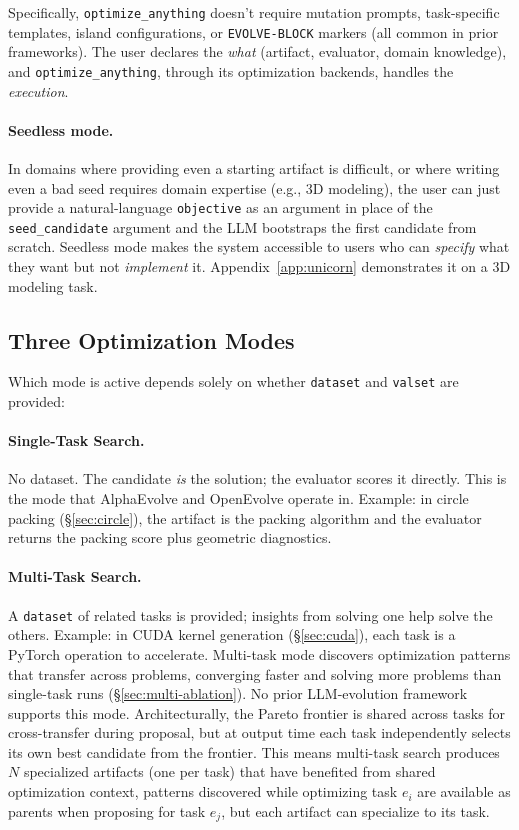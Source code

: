 \documentclass[sigconf]{acmart}
\newcommand{\oa}{\texttt{optimize\_anything}}
\begin{document}
Specifically, \oa{} doesn't require mutation prompts, task-specific templates, island configurations, or \texttt{EVOLVE-BLOCK} markers (all common in prior frameworks). The user declares the \emph{what} (artifact, evaluator, domain knowledge), and \oa{}, through its optimization backends, handles the \emph{execution}.

\paragraph{Seedless mode.} In domains where providing even a starting artifact is difficult, or where writing even a bad seed requires domain expertise (e.g., 3D modeling), the user can just provide a natural-language \texttt{objective} as an argument in place of the \texttt{seed\_candidate} argument and the LLM bootstraps the first candidate from scratch. Seedless mode makes the system accessible to users who can \emph{specify} what they want but not \emph{implement} it. Appendix~\ref{app:unicorn} demonstrates it on a 3D modeling task.

\subsection{Three Optimization Modes}\label{sec:modes}

Which mode is active depends solely on whether \texttt{dataset} and \texttt{valset} are provided:

\paragraph{Single-Task Search.} No dataset. The candidate \emph{is} the solution; the evaluator scores it directly. This is the mode that AlphaEvolve and OpenEvolve operate in. Example: in circle packing (\S\ref{sec:circle}), the artifact is the packing algorithm and the evaluator returns the packing score plus geometric diagnostics.

\paragraph{Multi-Task Search.} A \texttt{dataset} of related tasks is provided; insights from solving one help solve the others. Example: in CUDA kernel generation (\S\ref{sec:cuda}), each task is a PyTorch operation to accelerate. Multi-task mode discovers optimization patterns that transfer across problems, converging faster and solving more problems than single-task runs (\S\ref{sec:multi-ablation}). No prior LLM-evolution framework supports this mode. Architecturally, the Pareto frontier is shared across tasks for cross-transfer during proposal, but at output time each task independently selects its own best candidate from the frontier. This means multi-task search produces $N$ specialized artifacts (one per task) that have benefited from shared optimization context, patterns discovered while optimizing task $e_i$ are available as parents when proposing for task $e_j$, but each artifact can specialize to its task.
\end{document}
